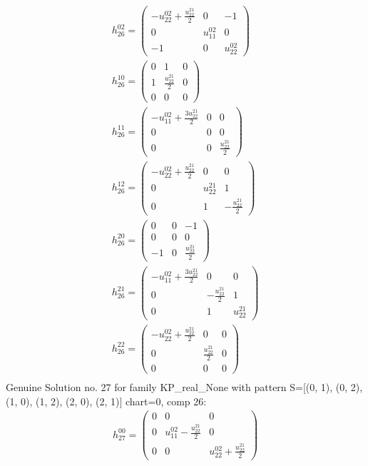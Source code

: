 \documentclass[a4paper, 11pt, twoside, onecolumn]{article}
\begin{document}
\begin{landscape}
\begin{gather*}
	 h_{26}^{02}=\begin{pmatrix}- u^{02}_{22} + \frac{u^{21}_{22}}{2} & 0 & -1\\0 & u^{02}_{11} & 0\\-1 & 0 & u^{02}_{22}\end{pmatrix}\\ 
	 h_{26}^{10}=\begin{pmatrix}0 & 1 & 0\\1 & \frac{u^{21}_{22}}{2} & 0\\0 & 0 & 0\end{pmatrix}\\ 
	 h_{26}^{11}=\begin{pmatrix}- u^{02}_{11} + \frac{3 u^{21}_{22}}{2} & 0 & 0\\0 & 0 & 0\\0 & 0 & \frac{u^{21}_{22}}{2}\end{pmatrix}\\ 
	 h_{26}^{12}=\begin{pmatrix}- u^{02}_{22} + \frac{u^{21}_{22}}{2} & 0 & 0\\0 & u^{21}_{22} & 1\\0 & 1 & - \frac{u^{21}_{22}}{2}\end{pmatrix}\\ 
	 h_{26}^{20}=\begin{pmatrix}0 & 0 & -1\\0 & 0 & 0\\-1 & 0 & \frac{u^{21}_{22}}{2}\end{pmatrix}\\ 
	 h_{26}^{21}=\begin{pmatrix}- u^{02}_{11} + \frac{3 u^{21}_{22}}{2} & 0 & 0\\0 & - \frac{u^{21}_{22}}{2} & 1\\0 & 1 & u^{21}_{22}\end{pmatrix}\\ 
	 h_{26}^{22}=\begin{pmatrix}- u^{02}_{22} + \frac{u^{21}_{22}}{2} & 0 & 0\\0 & \frac{u^{21}_{22}}{2} & 0\\0 & 0 & 0\end{pmatrix}\\ 
\end{gather*} 
Genuine Solution no. 27 for family KP_real_None with pattern S=[(0, 1), (0, 2), (1, 0), (1, 2), (2, 0), (2, 1)] chart=0, comp 26: 
\begin{gather*} 
	 h_{27}^{00}=\begin{pmatrix}0 & 0 & 0\\0 & u^{02}_{11} - \frac{u^{21}_{22}}{2} & 0\\0 & 0 & u^{02}_{22} + \frac{u^{21}_{22}}{2}\end{pmatrix}\\ 

\end{gather*}
\end{landscape}
\end{document}
